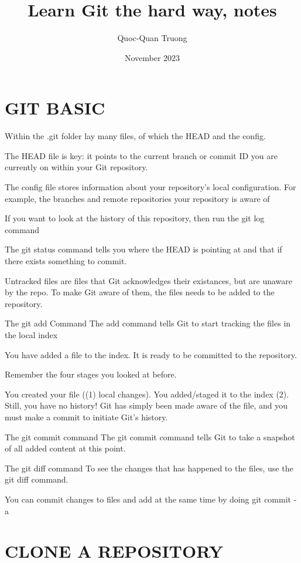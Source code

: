 \documentclass{report}
\title{Learn Git the hard way, notes}
\author{Quoc-Quan Truong}
\date{November 2023}
\begin{document}
\maketitle

\newpage
\tableofcontents
\newpage

\chapter{GIT BASIC}

Within the .git folder lay many files, of which the HEAD and the config.

The HEAD file is key: it points to the current branch or commit ID you are currently on within your Git repository.

The config file stores information about your repository's local configuration. For example, the branches and remote repositories your repository is aware of

If you want to look at the history of this repository, then run the git log command

The git status command tells you where the HEAD is pointing at and that if there exists something to commit.

Untracked files are files that Git acknowledges their existances, but are unaware by the repo. To make Git aware of them, the files needs to be added to the repository.

The git add Command
The add command tells Git to start tracking the files in the local index

You have added a file to the index. It is ready to be committed to the repository.

Remember the four stages you looked at before.

You created your file ((1) local changes).
You added/staged it to the index (2).
Still, you have no history! Git has simply been made aware of the file, and you must make a commit to initiate Git's history.

The git commit command
The git commit command tells Git to take a snapshot of all added content at this point.

The git diff command
To see the changes that has happened to the files, use the git diff command.

You can commit changes to files and add at the same time by doing git commit -a

\chapter{CLONE A REPOSITORY}
\end{document}
